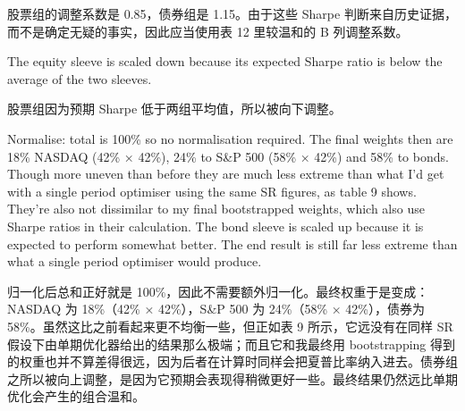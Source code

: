 \begin{chineseblock}股票组的调整系数是 0.85，债券组是 1.15。由于这些 Sharpe 判断来自历史证据，而不是确定无疑的事实，因此应当使用表 12 里较温和的 B 列调整系数。\end{chineseblock}


\begin{englishblock} The equity sleeve is scaled down because its expected Sharpe ratio is below the average of the two sleeves. \end{englishblock}

\begin{chineseblock}股票组因为预期 Sharpe 低于两组平均值，所以被向下调整。\end{chineseblock}


\begin{englishblock} Normalise: total is 100\% so no normalisation required. The final weights then are 18\% NASDAQ (42\% × 42\%), 24\% to S\&P 500 (58\% × 42\%) and 58\% to bonds. Though more uneven than before they are much less extreme than what I'd get with a single period optimiser using the same SR figures, as table 9 shows. They're also not dissimilar to my final bootstrapped weights, which also use Sharpe ratios in their calculation. The bond sleeve is scaled up because it is expected to perform somewhat better. The end result is still far less extreme than what a single period optimiser would produce. \end{englishblock}

\begin{chineseblock}归一化后总和正好就是 100\%，因此不需要额外归一化。最终权重于是变成：NASDAQ 为 18\%（42\% × 42\%），S\&P 500 为 24\%（58\% × 42\%），债券为 58\%。虽然这比之前看起来更不均衡一些，但正如表 9 所示，它远没有在同样 SR 假设下由单期优化器给出的结果那么极端；而且它和我最终用 bootstrapping 得到的权重也并不算差得很远，因为后者在计算时同样会把夏普比率纳入进去。债券组之所以被向上调整，是因为它预期会表现得稍微更好一些。最终结果仍然远比单期优化会产生的组合温和。\end{chineseblock}

